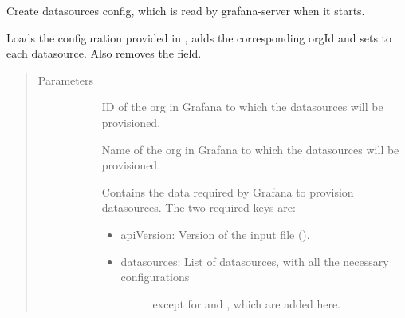 \documentclass[letterpaper,10pt,english]{sphinxmanual}
\begin{document}

\begin{fulllineitems}
\label{\detokenize{inputs:gpInputs.provisionDatasources}}
Create datasources config, which is read by grafana-server when it starts.

Loads the configuration provided in , adds the corresponding
orgId and sets  to each datasource. Also removes the
 field.
\begin{quote}\begin{description}
\item[{Parameters}] \leavevmode\begin{description}
\item[{}] \leavevmode{[}\sphinxtitleref{int}{]}
ID of the org in Grafana to which the datasources will be provisioned.

\item[{}] \leavevmode{[}\sphinxtitleref{str}{]}
Name of the org in Grafana to which the datasources will be provisioned.

\item[{}] \leavevmode{[}\sphinxtitleref{dict}{]}
Contains the data required by Grafana to provision datasources. The two
required keys are:
\begin{itemize}
\item {} 
apiVersion: Version of the input  file ().

\item {} \begin{description}
\item[{datasources: List of datasources, with all the necessary configurations}] \leavevmode
except for  and , which are added here.

\end{description}

\end{itemize}

\end{description}


\end{description}
\end{quote}
\end{fulllineitems}
\end{document}
